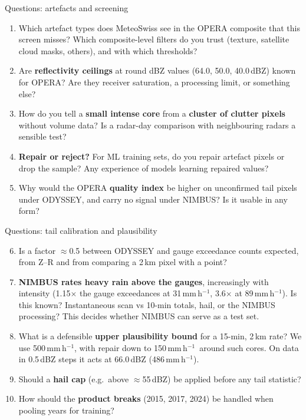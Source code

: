 \documentclass[aspectratio=169,10pt]{beamer}
\newcommand{\mmh}{\,mm\,h$^{-1}$}
\begin{document}
\begin{frame}{Questions: artefacts and screening}
  \small
  \begin{enumerate}
    \item Which artefact types does MeteoSwiss see in the OPERA composite that this screen
      misses? Which composite-level filters do you trust (texture, satellite cloud masks,
      others), and with which thresholds?
    \item Are \textbf{reflectivity ceilings} at round dBZ values (64.0, 50.0, 40.0\,dBZ) known
      for OPERA? Are they receiver saturation, a processing limit, or something else?
    \item How do you tell a \textbf{small intense core} from a \textbf{cluster of clutter
      pixels} without volume data? Is a radar-day comparison with neighbouring radars a
      sensible test?
    \item \textbf{Repair or reject?} For ML training sets, do you repair artefact pixels or
      drop the sample? Any experience of models learning repaired values?
    \item Why would the OPERA \textbf{quality index} be higher on unconfirmed tail pixels under
      ODYSSEY, and carry no signal under NIMBUS? Is it usable in any form?
  \end{enumerate}
\end{frame}

\begin{frame}{Questions: tail calibration and plausibility}
  \small
  \begin{enumerate}
    \setcounter{enumi}{5}
    \item Is a factor $\approx$0.5 between ODYSSEY and gauge exceedance counts expected, from
      Z--R and from comparing a 2\,km pixel with a point?
    \item \textbf{NIMBUS rates heavy rain above the gauges}, increasingly with intensity
      (1.15$\times$ the gauge exceedances at 31\mmh, 3.6$\times$ at 89\mmh). Is this known?
      Instantaneous scan vs 10-min totals, hail, or the NIMBUS processing? This decides
      whether NIMBUS can serve as a test set.
    \item What is a defensible \textbf{upper plausibility bound} for a 15-min, 2\,km rate? We
      use 500\mmh, with repair down to 150\mmh\ around such cores. On data in 0.5\,dBZ steps
      it acts at 66.0\,dBZ (486\mmh).
    \item Should a \textbf{hail cap} (e.g.\ above $\approx$55\,dBZ) be applied before any tail
      statistic?
    \item How should the \textbf{product breaks} (2015, 2017, 2024) be handled when pooling
      years for training?
  \end{enumerate}
\end{frame}
\end{document}
